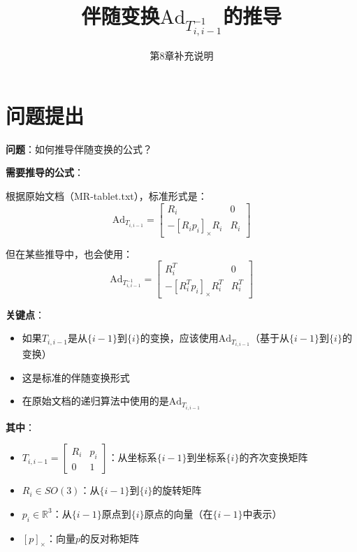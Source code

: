 \documentclass[12pt,a4paper]{article}
\title{伴随变换$\text{Ad}_{T_{i,i-1}^{-1}}$的推导}
\author{第8章补充说明}
\date{}
\begin{document}
\maketitle

\section{问题提出}

\textbf{问题}：如何推导伴随变换的公式？

\textbf{需要推导的公式}：

根据原始文档（MR-tablet.txt），标准形式是：
\begin{equation}
\text{Ad}_{T_{i,i-1}} = \begin{bmatrix}
R_i & 0 \\
-[R_i p_i]_{\times} R_i & R_i
\end{bmatrix}
\end{equation}

但在某些推导中，也会使用：
\begin{equation}
\text{Ad}_{T_{i,i-1}^{-1}} = \begin{bmatrix}
R_i^T & 0 \\
-[R_i^T p_i]_{\times} R_i^T & R_i^T
\end{bmatrix}
\end{equation}

\textbf{关键点}：
\begin{itemize}
\item 如果$T_{i,i-1}$是从$\{i-1\}$到$\{i\}$的变换，应该使用$\text{Ad}_{T_{i,i-1}}$（基于从$\{i-1\}$到$\{i\}$的变换）
\item 这是标准的伴随变换形式
\item 在原始文档的递归算法中使用的是$\text{Ad}_{T_{i,i-1}}$
\end{itemize}

\textbf{其中}：
\begin{itemize}
\item $T_{i,i-1} = \begin{bmatrix} R_i & p_i \\ 0 & 1 \end{bmatrix}$：从坐标系$\{i-1\}$到坐标系$\{i\}$的齐次变换矩阵
\item $R_i \in SO(3)$：从$\{i-1\}$到$\{i\}$的旋转矩阵
\item $p_i \in \mathbb{R}^3$：从$\{i-1\}$原点到$\{i\}$原点的向量（在$\{i-1\}$中表示）
\item $[p]_{\times}$：向量$p$的反对称矩阵
\end{itemize}
\end{document}
